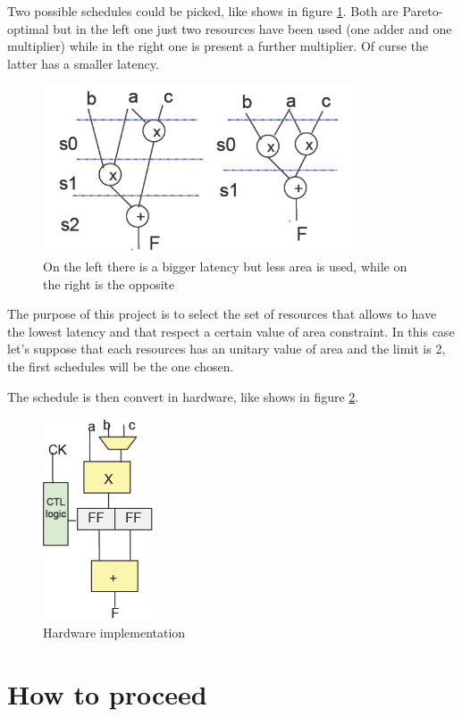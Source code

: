 Two possible schedules could be picked, like shows in figure \ref{fig:DFG_schedules}. Both are Pareto-optimal but in the left one just two resources have been used (one adder and one multiplier) while in the right one is present a further multiplier. Of curse the latter has a smaller latency.
 
\begin{figure}[h]
\centering
\includegraphics[height=5cm]{chapters/figures/dfg_scheduled.png}
\caption{On the left there is a bigger latency but less area is used, while on the right is the opposite}
\label{fig:DFG_schedules}
\end{figure}

The purpose of this project is to select the set of resources that allows to have the lowest latency and that respect a certain value of area constraint.
In this case let's suppose that each resources has an unitary value of area and the limit is 2,  the first schedules will be the one chosen.

The schedule is then convert in hardware, like shows in figure \ref{fig:HW_schedules}.

\begin{figure}[h]
\centering
\includegraphics[height=6cm]{chapters/figures/HW_scheduling.png}
\caption{Hardware implementation}
\label{fig:HW_schedules}
\end{figure}

\section{How to proceed}

